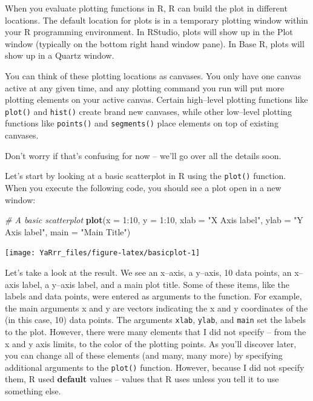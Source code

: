 \documentclass[]{book}
\newenvironment{Shaded}{\begin{snugshade}}{\end{snugshade}}
\newcommand{\KeywordTok}[1]{\textcolor[rgb]{0.13,0.29,0.53}{\textbf{{#1}}}}
\newcommand{\DataTypeTok}[1]{\textcolor[rgb]{0.13,0.29,0.53}{{#1}}}
\newcommand{\DecValTok}[1]{\textcolor[rgb]{0.00,0.00,0.81}{{#1}}}
\newcommand{\StringTok}[1]{\textcolor[rgb]{0.31,0.60,0.02}{{#1}}}
\newcommand{\CommentTok}[1]{\textcolor[rgb]{0.56,0.35,0.01}{\textit{{#1}}}}
\newcommand{\NormalTok}[1]{{#1}}
\theoremstyle{definition}
\theoremstyle{definition}
\theoremstyle{remark}
\begin{document}
When you evaluate plotting functions in R, R can build the plot in
different locations. The default location for plots is in a temporary
plotting window within your R programming environment. In RStudio, plots
will show up in the Plot window (typically on the bottom right hand
window pane). In Base R, plots will show up in a Quartz window.

You can think of these plotting locations as canvases. You only have one
canvas active at any given time, and any plotting command you run will
put more plotting elements on your active canvas. Certain high--level
plotting functions like \texttt{plot()} and \texttt{hist()} create brand
new canvases, while other low--level plotting functions like
\texttt{points()} and \texttt{segments()} place elements on top of
existing canvases.

Don't worry if that's confusing for now -- we'll go over all the details
soon.

Let's start by looking at a basic scatterplot in R using the
\texttt{plot()} function. When you execute the following code, you
should see a plot open in a new window:

\begin{Shaded}
\begin{Highlighting}[]
\CommentTok{# A basic scatterplot}
\KeywordTok{plot}\NormalTok{(}\DataTypeTok{x =} \DecValTok{1}\NormalTok{:}\DecValTok{10}\NormalTok{,}
     \DataTypeTok{y =} \DecValTok{1}\NormalTok{:}\DecValTok{10}\NormalTok{,}
     \DataTypeTok{xlab =} \StringTok{"X Axis label"}\NormalTok{,}
     \DataTypeTok{ylab =} \StringTok{"Y Axis label"}\NormalTok{,}
     \DataTypeTok{main =} \StringTok{"Main Title"}\NormalTok{)}
\end{Highlighting}
\end{Shaded}

\begin{center}\texttt{[image: YaRrr\_files/figure-latex/basicplot-1]} \end{center}

Let's take a look at the result. We see an x--axis, a y--axis, 10 data
points, an x--axis label, a y--axis label, and a main plot title. Some
of these items, like the labels and data points, were entered as
arguments to the function. For example, the main arguments x and y are
vectors indicating the x and y coordinates of the (in this case, 10)
data points. The arguments \texttt{xlab}, \texttt{ylab}, and
\texttt{main} set the labels to the plot. However, there were many
elements that I did not specify -- from the x and y axis limits, to the
color of the plotting points. As you'll discover later, you can change
all of these elements (and many, many more) by specifying additional
arguments to the \texttt{plot()} function. However, because I did not
specify them, R used \textbf{default} values -- values that R uses
unless you tell it to use something else.
\end{document}
